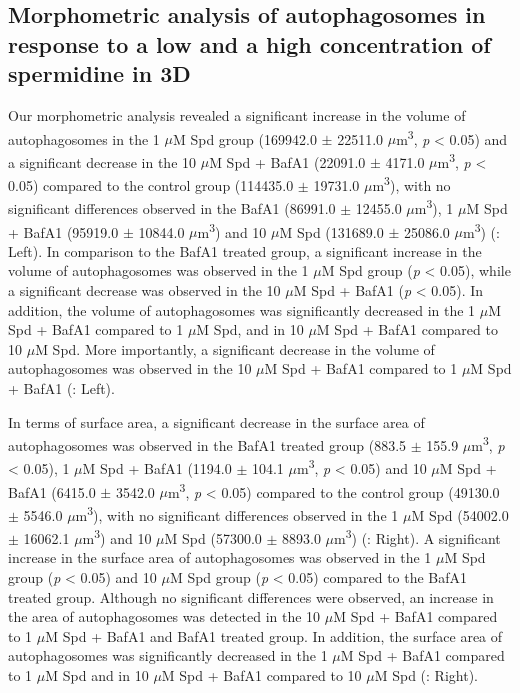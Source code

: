 \subsection{Morphometric analysis of autophagosomes in response to a low and a high concentration of spermidine in 3D}
Our morphometric analysis revealed a significant increase in the volume of autophagosomes in the 1 $\mu$M Spd group (169942.0 $\pm$ 22511.0 $\mu$m\textsuperscript{3}, \textit{p} < 0.05) and a significant decrease in the 10 $\mu$M Spd + BafA1 (22091.0 $\pm$ 4171.0 $\mu$m\textsuperscript{3}, \textit{p} < 0.05) compared to the control group (114435.0 $\pm$ 19731.0 $\mu$m\textsuperscript{3}), with no significant differences observed in the BafA1 (86991.0 $\pm$ 12455.0 $\mu$m\textsuperscript{3}), 1 $\mu$M Spd + BafA1 (95919.0 $\pm$ 10844.0 $\mu$m\textsuperscript{3}) and 10 $\mu$M Spd (131689.0 $\pm$ 25086.0 $\mu$m\textsuperscript{3}) (: Left). In comparison to the BafA1 treated group, a significant increase in the volume of autophagosomes was observed in the 1 $\mu$M Spd group (\textit{p} < 0.05), while a significant decrease was observed in the 10 $\mu$M Spd + BafA1 (\textit{p} < 0.05). In addition, the volume of autophagosomes was significantly decreased in the 1 $\mu$M Spd + BafA1 compared to 1 $\mu$M Spd, and in 10 $\mu$M Spd + BafA1 compared to 10 $\mu$M Spd. More importantly, a significant decrease in the volume of autophagosomes was observed in the 10 $\mu$M Spd + BafA1 compared to 1 $\mu$M Spd + BafA1 (: Left). 

In terms of surface area, a significant decrease in the surface area of autophagosomes was observed in the BafA1 treated group (883.5 $\pm$ 155.9 $\mu$m\textsuperscript{3}, \textit{p} < 0.05), 1 $\mu$M Spd + BafA1 (1194.0 $\pm$ 104.1 $\mu$m\textsuperscript{3}, \textit{p} < 0.05) and 10 $\mu$M Spd + BafA1 (6415.0 $\pm$ 3542.0 $\mu$m\textsuperscript{3}, \textit{p} < 0.05) compared to the control group (49130.0 $\pm$ 5546.0 $\mu$m\textsuperscript{3}), with no significant differences observed in the 1 $\mu$M Spd (54002.0 $\pm$ 16062.1 $\mu$m\textsuperscript{3}) and 10 $\mu$M Spd (57300.0 $\pm$ 8893.0 $\mu$m\textsuperscript{3}) (: Right). A significant increase in the surface area of autophagosomes was observed in the 1 $\mu$M Spd group (\textit{p} < 0.05) and 10 $\mu$M Spd group (\textit{p} < 0.05) compared to the BafA1 treated group. Although no significant differences were observed, an increase in the area of autophagosomes was detected in the 10 $\mu$M Spd + BafA1 compared to 1 $\mu$M Spd + BafA1 and BafA1 treated group. In addition, the surface area of autophagosomes was significantly decreased in the 1 $\mu$M Spd + BafA1 compared to 1 $\mu$M Spd and in 10 $\mu$M Spd + BafA1 compared to 10 $\mu$M Spd (: Right). 

